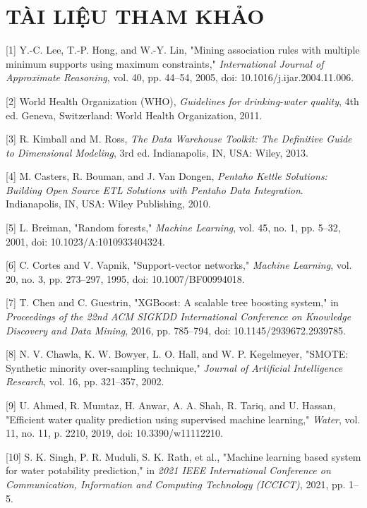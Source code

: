 \section*{TÀI LIỆU THAM KHẢO}

[1] Y.-C. Lee, T.-P. Hong, and W.-Y. Lin, "Mining association rules with multiple minimum supports using maximum constraints," \textit{International Journal of Approximate Reasoning}, vol. 40, pp. 44–54, 2005, doi: 10.1016/j.ijar.2004.11.006.

[2] World Health Organization (WHO), \textit{Guidelines for drinking-water quality}, 4th ed. Geneva, Switzerland: World Health Organization, 2011.

[3] R. Kimball and M. Ross, \textit{The Data Warehouse Toolkit: The Definitive Guide to Dimensional Modeling}, 3rd ed. Indianapolis, IN, USA: Wiley, 2013.

[4] M. Casters, R. Bouman, and J. Van Dongen, \textit{Pentaho Kettle Solutions: Building Open Source ETL Solutions with Pentaho Data Integration}. Indianapolis, IN, USA: Wiley Publishing, 2010.

[5] L. Breiman, "Random forests," \textit{Machine Learning}, vol. 45, no. 1, pp. 5--32, 2001, doi: 10.1023/A:1010933404324.

[6] C. Cortes and V. Vapnik, "Support-vector networks," \textit{Machine Learning}, vol. 20, no. 3, pp. 273--297, 1995, doi: 10.1007/BF00994018.

[7] T. Chen and C. Guestrin, "XGBoost: A scalable tree boosting system," in \textit{Proceedings of the 22nd ACM SIGKDD International Conference on Knowledge Discovery and Data Mining}, 2016, pp. 785--794, doi: 10.1145/2939672.2939785.

[8] N. V. Chawla, K. W. Bowyer, L. O. Hall, and W. P. Kegelmeyer, "SMOTE: Synthetic minority over-sampling technique," \textit{Journal of Artificial Intelligence Research}, vol. 16, pp. 321--357, 2002.

[9] U. Ahmed, R. Mumtaz, H. Anwar, A. A. Shah, R. Tariq, and U. Hassan, "Efficient water quality prediction using supervised machine learning," \textit{Water}, vol. 11, no. 11, p. 2210, 2019, doi: 10.3390/w11112210.

[10] S. K. Singh, P. R. Muduli, S. K. Rath, et al., "Machine learning based system for water potability prediction," in \textit{2021 IEEE International Conference on Communication, Information and Computing Technology (ICCICT)}, 2021, pp. 1--5.

